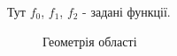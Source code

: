 \documentclass[a4 paper,12pt,ukrainian]{report}
\begin{document}
Тут $f_0$, $f_1$, $f_2$ - задані функції.
\begin{figure}[htb]
\caption{Геометрія області}
\label{fig:image}
\end{figure}

\end{document}
